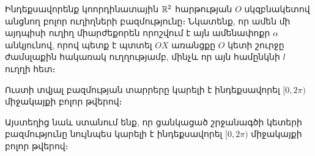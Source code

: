 \documentclass[./main.tex]{subfiles}
\begin{document}
\begin{example}\label{ch1ex5}
Ինդեքսավորենք կոորդինատային $\mathbb{R}^2$ հարթության $O$ սկզբնակետով անցնող բոլոր ուղիղների բազմությունը։ Նկատենք, որ ամեն մի այդպիսի ուղիղ միարժեքորեն որոշվում է այն ամենափոքր $\alpha$ անկյունով, որով պետք է պտտել $OX$ առանցքը $O$ կետի շուրջը ժամսլաքին հակառակ ուղղությամբ, մինչև որ այն համընկնի $l$ ուղղի հետ։ 
\begin{center}
\end{center}
Ուստի տվյալ բազմության տարրերը կարելի է ինդեքսավորել $[0,2\pi)$ միջակայքի բոլոր թվերով։
\par Այստեղից նաև ստանում ենք, որ ցանկացած շրջանագծի կետերի բազմությունը նույնպես կարելի է ինդեքսավորել $[0,2\pi)$ միջակայքի բոլոր թվերով։


\end{example}
\end{document}
